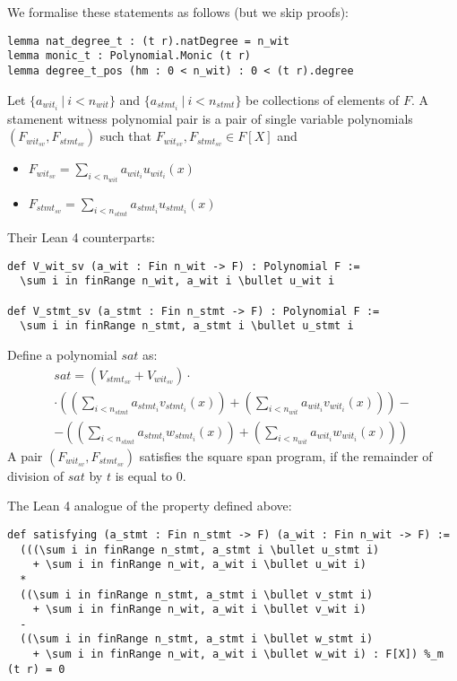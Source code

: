 \documentclass{article}
\theoremstyle{definition}
\theoremstyle{remark}
\begin{document}
We formalise these statements as follows (but we skip proofs):
\begin{lstlisting}
lemma nat_degree_t : (t r).natDegree = n_wit
lemma monic_t : Polynomial.Monic (t r)
lemma degree_t_pos (hm : 0 < n_wit) : 0 < (t r).degree
\end{lstlisting}

Let $\{ a_{{wit}_i} \: | \: i < n_{wit}\}$ and $\{ a_{{stmt}_i} \: | \: i < n_{stmt} \}$ be collections of elements of $F$. A stamenent witness polynomial pair is a pair of single variable polynomials $(F_{{wit}_{sv}}, F_{{stmt}_{sv}})$
such that $F_{{wit}_{sv}}, F_{{stmt}_{sv}} \in F[X]$ and
\begin{itemize}
\item $F_{{wit}_{sv}} = \sum \limits_{i < n_{wit}} a_{{wit}_i} u_{{wit}_{i}}(x)$
\item $F_{{stmt}_{sv}} = \sum \limits_{i < n_{stmt}} a_{{stmt}_i} u_{{stmt}_{i}}(x)$
\end{itemize}

Their Lean 4 counterparts:
\begin{lstlisting}
def V_wit_sv (a_wit : Fin n_wit -> F) : Polynomial F :=
  \sum i in finRange n_wit, a_wit i \bullet u_wit i

def V_stmt_sv (a_stmt : Fin n_stmt -> F) : Polynomial F :=
  \sum i in finRange n_stmt, a_stmt i \bullet u_stmt i
\end{lstlisting}


Define a polynomial $sat$ as:
\begin{multline}
sat = (V_{{stmt}_{sv}} + V_{{wit}_{sv}}) \cdot \\ \cdot ((\sum \limits_{i < n_{stmt}} a_{{stmt}_i} v_{{stmt}_i}(x)) + (\sum \limits_{i < n_{wit}} a_{{wit}_i} v_{{wit}_i}(x) )) - \\ - ((\sum \limits_{i < n_{stmt}} a_{{stmt}_i} w_{{stmt}_i}(x)) + (\sum \limits_{i < n_{wit}} a_{{wit}_i} w_{{wit}_i}(x) ))
\end{multline}
A pair $(F_{{wit}_{sv}}, F_{{stmt}_{sv}})$ satisfies the square span program, if the remainder of division of $sat$ by $t$ is equal to $0$.

The Lean 4 analogue of the property defined above:
\begin{lstlisting}
def satisfying (a_stmt : Fin n_stmt -> F) (a_wit : Fin n_wit -> F) :=
  (((\sum i in finRange n_stmt, a_stmt i \bullet u_stmt i)
    + \sum i in finRange n_wit, a_wit i \bullet u_wit i)
  *
  ((\sum i in finRange n_stmt, a_stmt i \bullet v_stmt i)
    + \sum i in finRange n_wit, a_wit i \bullet v_wit i)
  -
  ((\sum i in finRange n_stmt, a_stmt i \bullet w_stmt i)
    + \sum i in finRange n_wit, a_wit i \bullet w_wit i) : F[X]) %_m (t r) = 0
\end{lstlisting}
\end{document}
